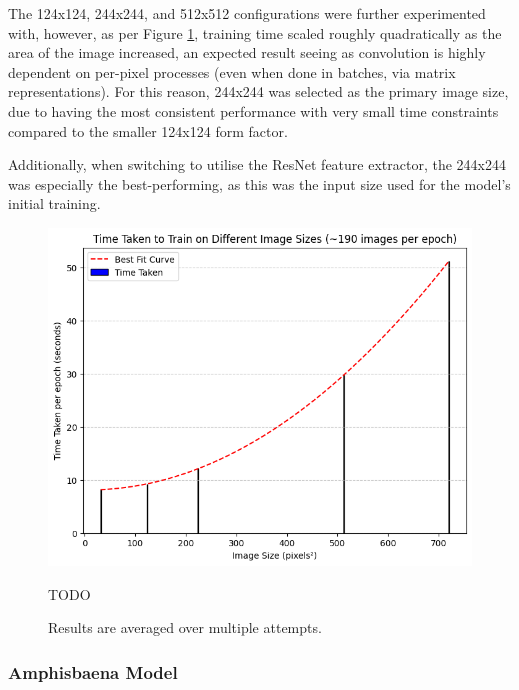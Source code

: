                         The 124x124, 244x244, and 512x512 configurations were further experimented with, however, as per Figure \ref{fig:CNNSize_Time}, training time scaled roughly quadratically as the area of the image increased, an expected result seeing as convolution is highly dependent on per-pixel processes (even when done in batches, via matrix representations). For this reason, 244x244 was selected as the primary image size, due to having the most consistent performance with very small time constraints compared to the smaller 124x124 form factor.
    
                        Additionally, when switching to utilise the ResNet feature extractor, the 244x244 was especially the best-performing, as this was the input size used for the model's initial training.
                
                        \begin{figure}[h]
                            \centering
                            \includegraphics[width=\textwidth]{images/CNNSize_Time.png}
                            \caption{TODO}
                            \label{fig:CNNSize_Time}
                            \caption*{Results are averaged over multiple attempts.}
                        \end{figure}
    
            \subsubsection{Amphisbaena Model}
    
